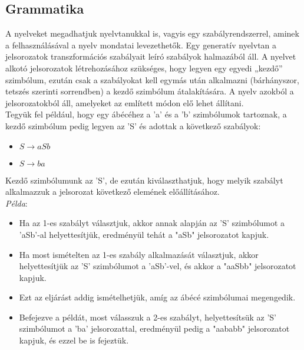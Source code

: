 \documentclass[12pt,margin=0px]{article}
\begin{document}
	\subsection*{Grammatika}

    \noindent A nyelveket megadhatjuk nyelvtanukkal is, vagyis egy szabályrendszerrel, aminek a felhasználásával a nyelv mondatai levezethetők. Egy generatív nyelvtan a jelsorozatok transzformációs szabályait leíró szabályok halmazából áll. A nyelvet alkotó jelsorozatok létrehozásához szükséges, hogy legyen egy egyedi „kezdő” szimbólum, ezután csak a szabályokat kell egymás után alkalmazni (bárhányszor, tetszés szerinti sorrendben) a kezdő szimbólum átalakítására. A nyelv azokból a jelsorozatokból áll, amelyeket az említett módon elő lehet állítani.\\

    \noindent Tegyük fel például, hogy egy ábécéhez a 'a' és a 'b' szimbólumok tartoznak, a kezdő szimbólum pedig legyen az 'S' és adottak a következő szabályok:
    \begin{itemize}
      \item $S \to aSb$
      \item $S \to ba$
    \end{itemize}	

    \noindent Kezdő szimbólumunk az 'S', de ezután kiválaszthatjuk, hogy melyik szabályt alkalmazzuk a jelsorozat következő elemének előállításához. \\

    \noindent \emph{Példa}:
    \begin{itemize}
        \item Ha az 1-es szabályt választjuk, akkor annak alapján az 'S' szimbólumot a 'aSb'-al helyettesítjük, eredményül tehát a "aSb" jelsorozatot kapjuk. \\
        \item Ha most ismételten az 1-es szabály alkalmazását választjuk, akkor helyettesítjük az 'S' szimbólumot a 'aSb'-vel, és akkor a "aaSbb" jelsorozatot kapjuk.\\
        \item Ezt az eljárást addig ismételhetjük, amíg az ábécé szimbólumai megengedik.\\
        \item Befejezve a példát, most válasszuk a 2-es szabályt, helyettesítsük az 'S' szimbólumot a 'ba' jelsorozattal, eredményül pedig a "aababb" jelsorozatot kapjuk, és ezzel be is fejeztük.
    \end{itemize}
\end{document}
